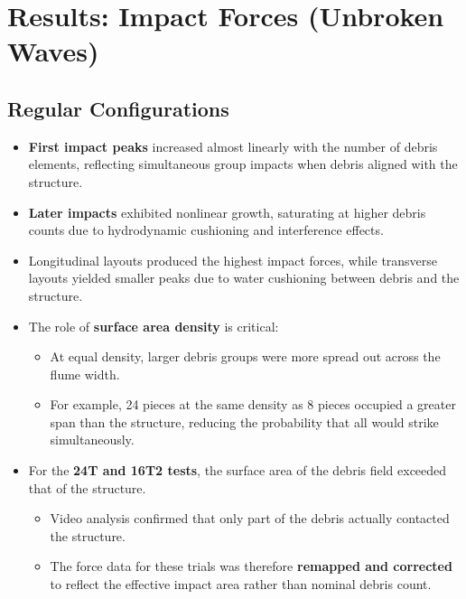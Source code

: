 \documentclass{article}
\begin{document}
\section{Results: Impact Forces (Unbroken Waves)}

\subsection{Regular Configurations}
\begin{itemize}
    \item \textbf{First impact peaks} increased almost linearly with the number of debris elements, reflecting simultaneous group impacts when debris aligned with the structure.
    \item \textbf{Later impacts} exhibited nonlinear growth, saturating at higher debris counts due to hydrodynamic cushioning and interference effects.
    \item Longitudinal layouts produced the highest impact forces, while transverse layouts yielded smaller peaks due to water cushioning between debris and the structure.
    \item The role of \textbf{surface area density} is critical:
    \begin{itemize}
        \item At equal density, larger debris groups were more spread out across the flume width.
        \item For example, 24 pieces at the same density as 8 pieces occupied a greater span than the structure, reducing the probability that all would strike simultaneously.
    \end{itemize}
    \item For the \textbf{24T and 16T2 tests}, the surface area of the debris field exceeded that of the structure.
    \begin{itemize}
        \item Video analysis confirmed that only part of the debris actually contacted the structure.
        \item The force data for these trials was therefore \textbf{remapped and corrected} to reflect the effective impact area rather than nominal debris count.
    \end{itemize}
\end{itemize}
\end{document}

